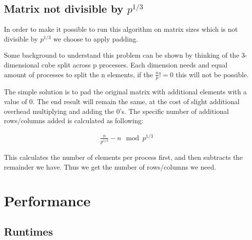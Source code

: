 \documentclass[a4paper,11pt,oneside]{book}
\begin{document}
\section{Matrix not divisible by $p^{1/3}$}
In order to make it possible to run this algorithm on matrix sizes which is not divisible by $p^{1/3}$ we choose to apply padding.

Some background to understand this problem can be shown by thinking of the 3-dimensional cube split across p processes. Each dimension needs and equal amount of processes to split the n elements, if the $\frac{n}{p} != 0$ this will not be possible.

The simple solution is to pad the original matrix with additional elements with a value of 0. The end result will remain the same, at the cost of slight additional overhead multiplying and adding the 0's. The specific number of additional rows/columns added is calculated as following:

\begin{align*}
    \frac{n}{p^{1/3}} - n \mod p^{1/3}
\end{align*}

This calculates the number of elements per process first, and then subtracts the remainder we have. Thus we get the number of rows/columns we need.

\chapter{Performance}
\section{Runtimes}


\end{document}

